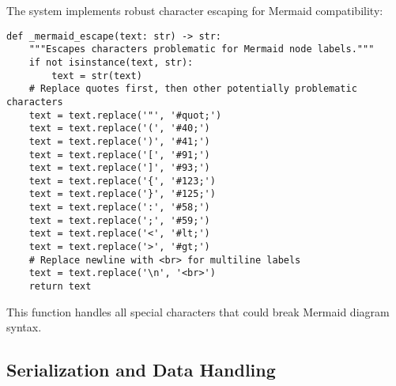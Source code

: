 \documentclass[12pt,a4paper]{article}
\begin{document}
The system implements robust character escaping for Mermaid compatibility:
\begin{pageablecode}
\begin{verbatim}
def _mermaid_escape(text: str) -> str:
    """Escapes characters problematic for Mermaid node labels."""
    if not isinstance(text, str):
        text = str(text)
    # Replace quotes first, then other potentially problematic characters
    text = text.replace('"', '#quot;')
    text = text.replace('(', '#40;')
    text = text.replace(')', '#41;')
    text = text.replace('[', '#91;')
    text = text.replace(']', '#93;')
    text = text.replace('{', '#123;')
    text = text.replace('}', '#125;')
    text = text.replace(':', '#58;')
    text = text.replace(';', '#59;')
    text = text.replace('<', '#lt;')
    text = text.replace('>', '#gt;')
    # Replace newline with <br> for multiline labels
    text = text.replace('\n', '<br>')
    return text
\end{verbatim}
\end{pageablecode}
This function handles all special characters that could break Mermaid diagram syntax.

\subsection*{Serialization and Data Handling}
\end{document}
